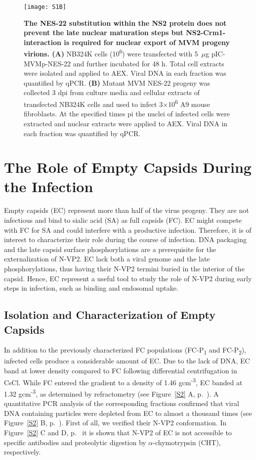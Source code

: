 \begin{figure}[b!]
\centering
  \texttt{[image: S1B]} \\[0.3cm]
  \caption[NS2-Crm1 Interaction is Required for Nuclear Export but Does Not Influence the Late Nuclear Maturation of MVM]
   {\textbf{The NES-22 substitution within the NS2 protein does not prevent the late nuclear maturation steps but NS2-Crm1-interaction is required for nuclear export of MVM progeny virions. (A)} NB324K cells (10\textsuperscript{6}) were transfected with 5~$\mu$g pIC-MVMp-NES-22 and further incubated for 48 h. Total cell extracts were isolated and applied to AEX. Viral DNA in each fraction was quantified by qPCR. \textbf{(B)} Mutant MVM NES-22 progeny was collected 3 dpi from culture media and cellular extracts of transfected NB324K cells and used to infect 3$\times$10\textsuperscript{6} A9 mouse fibroblasts. At the specified times pi the nuclei of infected cells were extracted and nuclear extracts were applied to AEX. Viral DNA in each fraction was quantified by qPCR.} 
\label{S1B}
\end{figure}
\clearpage

\section{The Role of Empty Capsids During the Infection}

Empty capsids (EC) represent more than half of the virus progeny. They are not infectious and bind to sialic acid (SA) as full capsids (FC). EC might compete with FC for SA and could interfere with a productive infection. Therefore, it is of interest to characterize their role during the course of infection. DNA packaging and the late capsid surface phosphorylations are a prerequisite for the externalization of N-VP2. EC lack both a viral genome and the late phosphorylations, thus having their N-VP2 termini buried in the interior of the capsid. Hence, EC represent a useful tool to study the role of N-VP2 during early steps in infection, such as binding and endosomal uptake.   

\subsection{Isolation and Characterization of Empty Capsids}

In addition to the previously characterized FC populations (FC-P\textsubscript{1} and FC-P\textsubscript{2}), infected cells produce a considerable amount of EC. Due to the lack of DNA, EC band at lower density compared to FC following differential centrifugation in CsCl. While FC entered the gradient to a density of 1.46 gcm\textsuperscript{-3}, EC banded at 1.32 gcm\textsuperscript{-3}, as determined by refractometry (see Figure~\ref{S2} A, p.~\pageref{S2}). A quantitative PCR analysis of the corresponding fractions confirmed that viral DNA containing particles were depleted from EC to almost a thousand times (see Figure~\ref{S2} B, p.~\pageref{S2}). First of all, we verified their N-VP2 conformation. In Figure~\ref{S2} C and D, p.~\pageref{S2} it is shown that N-VP2 of EC is not accessible to specific antibodies and proteolytic digestion by $\alpha$-chymotrypsin (CHT), respectively. 

